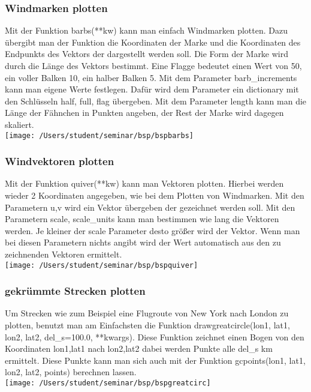 \subsubsection{Windmarken plotten}
Mit der Funktion \textsf{barbs(**kw)} kann man einfach Windmarken plotten. Dazu übergibt man der Funktion die Koordinaten der Marke und die Koordinaten des Endpunkts des Vektors der dargestellt werden soll. Die Form der Marke wird durch die Länge des Vektors bestimmt. Eine Flagge bedeutet einen Wert von 50, ein voller Balken 10, ein halber Balken 5. Mit dem Parameter \textsf{barb\_increments} kann man eigene Werte festlegen. Dafür wird dem Parameter ein \textsf{dictionary} mit den \textsf{Schlüsseln} \textsf{half, full, flag} übergeben. Mit dem Parameter \textsf{length} kann man die Länge der Fähnchen in Punkten angeben, der Rest der Marke wird dagegen skaliert.\\

\texttt{[image: /Users/student/seminar/bsp/bspbarbs]}\newpage 
\subsubsection{Windvektoren plotten}
  Mit der Funktion \textsf{quiver(**kw)} kann man Vektoren plotten. Hierbei werden wieder 2 Koordinaten angegeben, wie bei dem Plotten von Windmarken. Mit den Parametern \textsf{u,v} wird ein Vektor übergeben der gezeichnet werden soll. Mit den Parametern \textsf{scale, scale\_units} kann man bestimmen wie lang die Vektoren werden. Je kleiner der \textsf{scale} Parameter desto größer wird der Vektor. Wenn man bei diesen Parametern nichts angibt wird der Wert automatisch aus den zu zeichnenden Vektoren ermittelt.\\
  
  \texttt{[image: /Users/student/seminar/bsp/bspquiver]}\newpage 
  \subsubsection{gekrümmte Strecken plotten}
  Um Strecken wie zum Beispiel eine Flugroute von New York nach London zu plotten, benutzt man am Einfachsten die Funktion \textsf{drawgreatcircle(lon1, lat1, lon2, lat2, del\_s=100.0, **kwargs)}. Diese Funktion zeichnet einen Bogen von den Koordinaten \textsf{lon1,lat1} nach \textsf{lon2,lat2} dabei werden Punkte alle \textsf{del\_s} km ermittelt. Diese Punkte kann man sich auch mit der Funktion \textsf{gcpoints(lon1, lat1, lon2, lat2, points)} berechnen lassen.\\
  
  \texttt{[image: /Users/student/seminar/bsp/bspgreatcirc]}\newpage 
